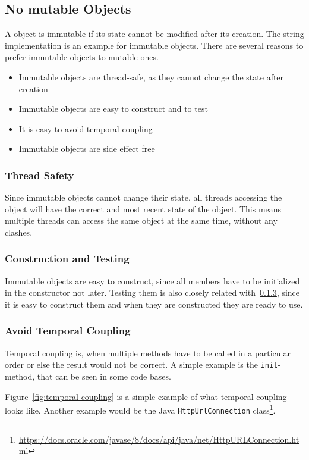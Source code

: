 \subsection{No mutable Objects}\label{subsec:no-mutable-objects}
A object is immutable if its state cannot be modified after its creation.
The string implementation is an example for immutable objects.
There are several reasons to prefer immutable objects to mutable ones.

\begin{itemize}
    \item Immutable objects are thread-safe, as they cannot change the state after creation
    \item Immutable objects are easy to construct and to test
    \item It is easy to avoid temporal coupling
    \item Immutable objects are side effect free
\end{itemize}

\subsubsection{Thread Safety}
Since immutable objects cannot change their state, all threads accessing the object will have the correct and most recent state of the object.
This means multiple threads can access the same object at the same time, without any clashes.

\subsubsection{Construction and Testing}
Immutable objects are easy to construct, since all members have to be initialized in the constructor not later.
Testing them is also closely related with\ \ref{subsubsec:avoid-temporal-coupling}, since it is easy to construct them and when they are constructed they are ready to use.

\subsubsection{Avoid Temporal Coupling}\label{subsubsec:avoid-temporal-coupling}
Temporal coupling is, when multiple methods have to be called in a particular order or else the result would not be correct.
A simple example is the \texttt{init}-method, that can be seen in some code bases.\cite{temporal-coupling}

Figure\ \ref{fig:temporal-coupling} is a simple example of what temporal coupling looks like.
Another example would be the Java \texttt{HttpUrlConnection} class\footnote{\url{https://docs.oracle.com/javase/8/docs/api/java/net/HttpURLConnection.html}}.

